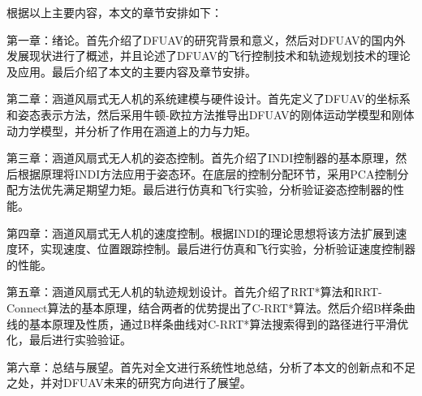 根据以上主要内容，本文的章节安排如下：

第一章：绪论。首先介绍了DFUAV的研究背景和意义，然后对DFUAV的国内外发展现状进行了概述，并且论述了DFUAV的飞行控制技术和轨迹规划技术的理论及应用。最后介绍了本文的主要内容及章节安排。

第二章：涵道风扇式无人机的系统建模与硬件设计。首先定义了DFUAV的坐标系和姿态表示方法，然后采用牛顿-欧拉方法推导出DFUAV的刚体运动学模型和刚体动力学模型，并分析了作用在涵道上的力与力矩。%

第三章：涵道风扇式无人机的姿态控制。首先介绍了INDI控制器的基本原理，然后根据原理将INDI方法应用于姿态环。在底层的控制分配环节，采用PCA控制分配方法优先满足期望力矩。最后进行仿真和飞行实验，分析验证姿态控制器的性能。

第四章：涵道风扇式无人机的速度控制。根据INDI的理论思想将该方法扩展到速度环，实现速度、位置跟踪控制。最后进行仿真和飞行实验，分析验证速度控制器的性能。

第五章：涵道风扇式无人机的轨迹规划设计。首先介绍了RRT*算法和RRT-Connect算法的基本原理，结合两者的优势提出了C-RRT*算法。然后介绍B样条曲线的基本原理及性质，通过B样条曲线对C-RRT*算法搜索得到的路径进行平滑优化，最后进行实验验证。

第六章：总结与展望。首先对全文进行系统性地总结，分析了本文的创新点和不足之处，并对DFUAV未来的研究方向进行了展望。

